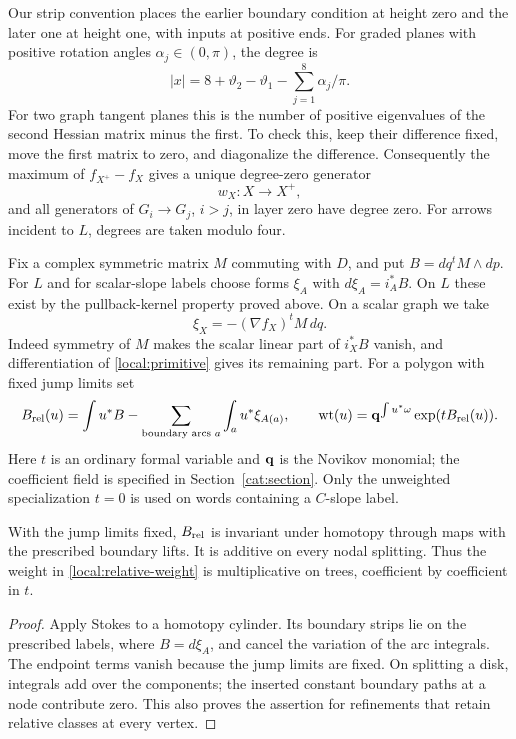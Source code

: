 Our strip convention places the earlier boundary condition at height zero
and the later one at height one, with inputs at positive ends.  For graded
planes with positive rotation angles $\alpha_j\in(0,\pi)$, the degree is
\begin{equation}\label{local:degree}
 |x|=8+\vartheta_2-\vartheta_1-\sum_{j=1}^8\alpha_j/\pi.
\end{equation}
For two graph tangent planes this is the number of positive eigenvalues of
the second Hessian matrix minus the first.  To check this, keep their
difference fixed, move the first matrix to zero, and diagonalize the
difference.  Consequently the maximum of $f_{X^+}-f_X$ gives a unique
degree-zero generator
\[
 w_X\colon X\longrightarrow X^+,
\]
and all generators of $G_i\to G_j$, $i>j$, in layer zero have degree zero.
For arrows incident to $L$, degrees are taken modulo four.

Fix a complex symmetric matrix $M$ commuting with $D$, and put
$B=dq^tM\wedge dp$.  For $L$ and for scalar-slope labels choose forms
$\xi_A$ with $d\xi_A=i_A^*B$.  On $L$ these exist by the pullback-kernel
property proved above.  On a scalar graph we take
\begin{equation}\label{local:primitive}
 \xi_X=-(\nabla f_X)^tM\,dq.
\end{equation}
Indeed symmetry of $M$ makes the scalar linear part of $i_X^*B$ vanish,
and differentiation of \eqref{local:primitive} gives its remaining part.
For a polygon with fixed jump limits set
\begin{equation}\label{local:relative-weight}
 B_{\rm rel}(u)=\int u^*B-\sum_{\text{boundary arcs }a}
                         \int_a u^*\xi_{A(a)},\qquad
 \mathrm{wt}(u)=\mathbf q^{\int u^*\omega}\exp(tB_{\rm rel}(u)).
\end{equation}
Here $t$ is an ordinary formal variable and $\mathbf q$ is the Novikov monomial;
the coefficient field is specified in Section~\ref{cat:section}.
Only the unweighted specialization $t=0$ is used on words containing a
$C$-slope label.

\begin{lemma}\label{local:weight}
With the jump limits fixed, $B_{\rm rel}$ is invariant under homotopy
through maps with the prescribed boundary lifts.  It is additive on every
nodal splitting.  Thus the weight in \eqref{local:relative-weight} is
multiplicative on trees, coefficient by coefficient in $t$.
\end{lemma}
\begin{proof}
Apply Stokes to a homotopy cylinder.  Its boundary strips lie on the
prescribed labels, where $B=d\xi_A$, and cancel the variation of the arc
integrals.  The endpoint terms vanish because the jump limits are fixed.
On splitting a disk, integrals add over the components; the inserted
constant boundary paths at a node contribute zero.  This also proves the
assertion for refinements that retain relative classes at every vertex.
\end{proof}

